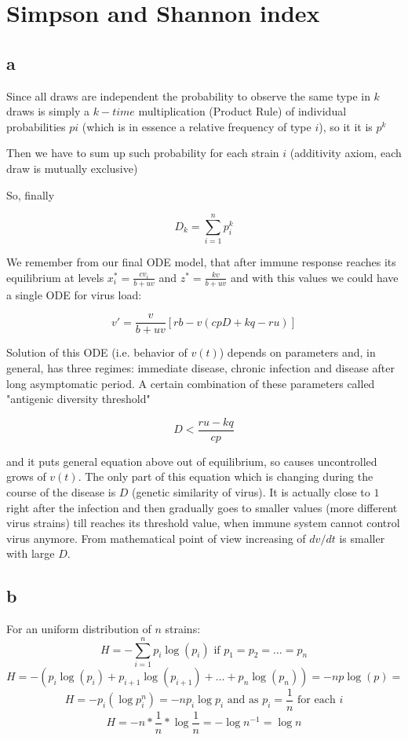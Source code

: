 \newcommand{\package}{\emph}

\setcounter{chapter}{1}
\setcounter{section}{0}
\section{Simpson and Shannon index}
\subsection{a}
Since all draws are independent the probability to observe the same type in $k$ draws is simply a $k-time$ multiplication (Product Rule) of individual probabilities $pi$ (which is in essence a relative frequency of type $i$), so it it is $p^k$

Then we have to sum up such probability for each strain $i$ (additivity axiom, each draw is mutually exclusive)

So, finally

\[ D_k = \sum\limits_{i=1}^{n} p_{i}^{k} \]

We remember from our final ODE model, that after immune response reaches its equilibrium at levels $x_i^* = \frac{cv_i}{b+uv}$ and $z^* = \frac{kv}{b+uv}$ and with this values we could have a single ODE for virus load:

\[ v' = \frac{v}{b+uv} [rb -v(cpD + kq -ru)]   \]

Solution of this ODE (i.e. behavior of $v(t)$) depends on parameters and, in general, has three regimes: immediate disease, chronic infection and disease after long asymptomatic period.
A certain combination of these parameters called "antigenic diversity threshold" 

\[ D < \frac{ru-kq}{cp} \]

and it puts general equation above out of equilibrium, so causes uncontrolled grows of $v(t)$.
The only part of this equation which is changing during the course of the disease is $D$ (genetic similarity of virus). It is actually close to $1$ right after the infection and then gradually goes to smaller values (more different virus strains) till reaches its threshold value, when immune system cannot control virus anymore. From mathematical point of view increasing of  $dv/dt$ is smaller with large $D$.

\subsection{b}

For an uniform distribution of $n$ strains:
\[ H = - \sum\limits_{i=1}^{n} p_i\log(p_i) \text{ if } p_1 = p_2  = \dots = p_n \]
\[ H = -(p_i\log(p_i)+p_{i+1}\log(p_{i+1}) + \dots+p_n\log(p_n)) =  -np\log(p) = \]
\[ H = -p_i(\log p_i^n) = -np_i\log p_i \text{ and as } p_i = \frac{1}{n} \text{ for each } i \]
\[H = -n * \frac{1}{n} * \log\frac{1}{n} = - \log n^{-1} = \log n\]

